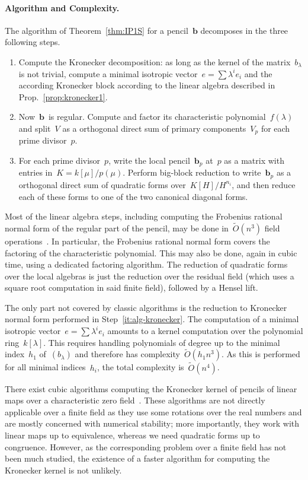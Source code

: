 \documentclass{lms}%
\def\Ot{\widetilde{O}}
\begin{document}
\paragraph{Algorithm and Complexity.}
The algorithm of Theorem~\ref{thm:IP1S} for a pencil~$\bm{b}$ decomposes
in the three following steps.
\begin{enumerate}
\item \label{it:alg-kronecker} Compute the Kronecker decomposition: as
long as the kernel of the matrix~$b_{λ}$ is not trivial, compute a
minimal isotropic vector~$e = ∑ λ^i e_i$ and the according Kronecker
block according to the linear algebra described in
Prop.~\ref{prop:kronecker1}.
\item \label{it:alg-factor} Now~$\bm{b}$~is regular. Compute and factor
its characteristic polynomial~$f(λ)$ and split~$V$ as a orthogonal direct
sum of primary components~$V_p$ for each prime divisor~$p$.
\item \label{it:alg-local} For each prime divisor~$p$, write the local
pencil~$\bm{b}_p$ at~$p$ as a matrix with entries in~$K = k[μ]/p(μ)$.
Perform big-block reduction to write~$\bm{b}_p$ as a orthogonal direct
sum of quadratic forms over~$K[H]/H^{n_i}$, and then reduce
each of these forms to one of the two canonical diagonal forms.
\end{enumerate}

Most of the linear algebra steps, including computing the Frobenius
rational normal form of the regular part of the pencil, may be done
in~$\Ot(n^3)$ field operations~\cite{kaltoffen11compute}. In particular,
the Frobenius rational normal form covers the factoring of the
characteristic polynomial. This may also be done, again in cubic time,
using a dedicated factoring algorithm. The reduction of quadratic forms
over the local algebras is just the reduction over the residual field
(which uses a square root computation in said finite field), followed by
a Hensel lift.

The only part not covered by classic algorithms is the reduction to
Kronecker normal form performed in Step~\ref{it:alg-kronecker}. The
computation of a minimal isotropic vector~$e = ∑ λ^i e_i$ amounts to a
kernel computation over the polynomial ring~$k[λ]$. This requires
handling polynomials of degree up to the minimal index~$h_1$ of~$(b_{λ})$
and therefore has complexity~$\Ot(h_1 n^3)$. As this is performed for all
minimal indices~$h_i$, the total complexity is~$\Ot(n^4)$.

There exist cubic algorithms computing the Kronecker kernel of pencils of
linear maps over a characteristic zero field~\cite{beelen1988improved}.
These algorithms are not directly applicable over a finite field as they
use some rotations over the real numbers and are mostly concerned with
numerical stability; more importantly, they work with linear maps up to
equivalence, whereas we need quadratic forms up to congruence. However, as the
corresponding problem over a finite field has not been much studied, the
existence of a faster algorithm for computing the Kronecker kernel is not
unlikely.
\end{document}
